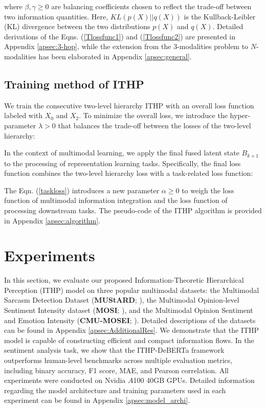 \documentclass{article} %
\begin{document}


where $\beta , \gamma \geq 0$ are balancing coefficients chosen to reflect the trade-off between two information quantities. Here, $KL\left ( p\left ( X \right ) || q\left ( X \right )\right ) $ is the Kullback-Leibler (KL) divergence between the two distributions $p\left ( X \right )$ and $q\left ( X \right )$. Detailed derivations of the Eqns. (\ref{Tlossfunc1}) and (\ref{Tlossfunc2}) are presented in Appendix \ref{apsec:3-hop}, while the extension from the 3-modalities problem to $N$-modalities has been elaborated in Appendix \ref{apsec:general}.

\subsection{Training method of ITHP}
We train the consecutive two-level hierarchy ITHP with an overall loss function labeled with $X_0$ and $X_2$. To minimize the overall loss, we introduce the hyper-parameter $\lambda > 0$ that balances the trade-off between the losses of the two-level hierarchy:



In the context of multimodal learning, we apply the final fused latent state $B_{k+1}$ to the processing of representation learning tasks. Specifically, the final loss function combines the two-level hierarchy loss with a task-related loss function:



The Eqn. (\ref{taskloss}) introduces a new parameter $\alpha \ge 0$ to weigh the loss function of multimodal information integration and the loss function of processing downstream tasks. The pseudo-code of the ITHP algorithm is provided in Appendix \ref{apsec:algorithm}.


\section{Experiments}
\label{sec:experiments}

In this section, we evaluate our proposed Information-Theoretic Hierarchical Perception (ITHP) model on three popular multimodal datasets: the Multimodal Sarcasm Detection Dataset (\textbf{MUStARD}; \citealp{castro2019towards}), the Multimodal Opinion-level Sentiment Intensity dataset (\textbf{MOSI}; \citealp{zadeh2016mosi}), and the Multimodal Opinion Sentiment and Emotion Intensity (\textbf{CMU-MOSEI}; \citealp{zadeh2018multimodal}). Detailed descriptions of the datasets can be found in Appendix \ref{apsec:AdditionalRes}. We demonstrate that the ITHP model is capable of constructing efficient and compact information flows. In the sentiment analysis task, we show that the ITHP-DeBERTa framework outperforms human-level benchmarks across multiple evaluation metrics, including binary accuracy, F1 score, MAE, and Pearson correlation. All experiments were conducted on Nvidia $A$100 40GB GPUs. Detailed information regarding the model architecture and training parameters used in each experiment can be found in Appendix \ref{apsec:model_archi}.
\end{document}
